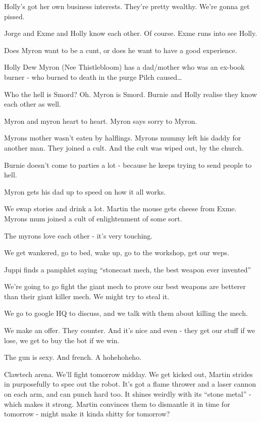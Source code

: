 Holly’s got her own business interests. They’re pretty wealthy. We’re gonna get pissed.\medskip

Jorge and Exme and Holly know each other. Of course. Exme runs into see Holly.\medskip

Does Myron want to be a cunt, or does he want to have a good experience.\medskip

Holly Dew Myron (Nee Thistlebloom) has a dad/mother who was an ex-book burner - who burned to death in the purge Pilch caused…\medskip

Who the hell is Smord? Oh. Myron is Smord. Burnie and Holly realise they know each other as well.\medskip

Myron and myron heart to heart. Myron says sorry to Myron.\medskip

Myrons mother wasn’t eaten by halflings. Myrons mummy left his daddy for another man. They joined a cult. And the cult was wiped out, by the church.\medskip

Burnie doesn’t come to parties a lot - because he keeps trying to send people to hell.\medskip

Myron gets his dad up to speed on how it all works.\medskip

We swap stories and drink a lot. Martin the mouse gets cheese from Exme. Myrons mum joined a cult of enlightenment of some sort.\medskip

The myrons love each other - it’s very touching.\medskip

We get wankered, go to bed, wake up, go to the workshop, get our weps.\medskip

Juppi finds a pamphlet saying “stonecast mech, the best weapon ever invented”\medskip

We’re going to go fight the giant mech to prove our best weapons are betterer than their giant killer mech. We might try to steal it.\medskip

We go to google HQ to discuss, and we talk with them about killing the mech.\medskip

We make an offer. They counter. And it’s nice and even - they get our stuff if we lose, we get to buy the bot if we win.\medskip

The gun is sexy. And french. A hohehoheho.\medskip

Clawtech arena. We’ll fight tomorrow midday. We get kicked out, Martin strides in purposefully to spec out the robot. It’s got a flame thrower and a laser cannon on each arm, and can punch hard too. It shines weirdly with its “stone metal” - which makes it strong. Martin convinces them to dismantle it in time for tomorrow - might make it kinda shitty for tomorrow?\medskip

\vspace*{5mm}

